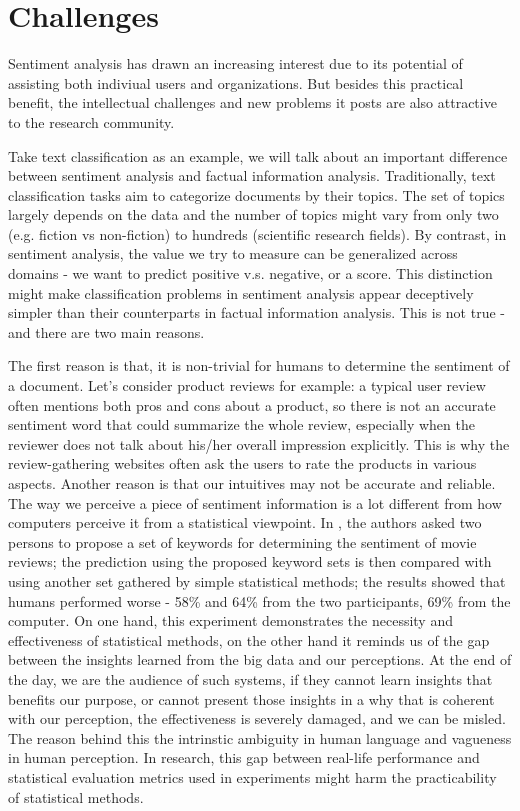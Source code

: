 \section{Challenges}

Sentiment analysis has drawn an increasing interest due to its potential of assisting both indiviual users and organizations. But besides this practical benefit, the intellectual challenges and new problems it posts are also attractive to the research community.

Take text classification as an example, we will talk about an important difference between sentiment analysis and factual information analysis. Traditionally, text classification tasks aim to categorize documents by their topics. The set of topics largely depends on the data and the number of topics might vary from only two (e.g. fiction vs non-fiction) to hundreds (scientific research fields). By contrast, in sentiment analysis, the value we try to measure can be generalized across domains - we want to predict positive v.s. negative, or a score. This distinction might make classification problems in sentiment analysis appear deceptively simpler than their counterparts in factual information analysis. This is not true - and there are two main reasons.

The first reason is that, it is non-trivial for humans to determine the sentiment of a document. Let's consider product reviews for example: a typical user review often mentions both pros and cons about a product, so there is not an accurate sentiment word that could summarize the whole review, especially when the reviewer does not talk about his/her overall impression explicitly. This is why the review-gathering websites often ask the users to rate the products in various aspects. Another reason is that our intuitives may not be accurate and reliable. The way we perceive a piece of sentiment information is a lot different from how computers perceive it from a statistical viewpoint. In \cite{pang2002thumbs}, the authors asked two persons to propose a set of keywords for determining the sentiment of movie reviews; the prediction using the proposed keyword sets is then compared with using another set gathered by simple statistical methods; the results showed that humans performed worse - 58\% and 64\% from the two participants, 69\% from the computer. On one hand, this experiment demonstrates the necessity and effectiveness of statistical methods, on the other hand it reminds us of the gap between the insights learned from the big data and our perceptions. At the end of the day, we are the audience of such systems, if they cannot learn insights that benefits our purpose, or cannot present those insights in a why that is coherent with our perception, the effectiveness is severely damaged, and we can be misled. The reason behind this the intrinstic ambiguity in human language and vagueness in human perception. In research, this gap between real-life performance and statistical evaluation metrics used in experiments might harm the practicability of statistical methods.

